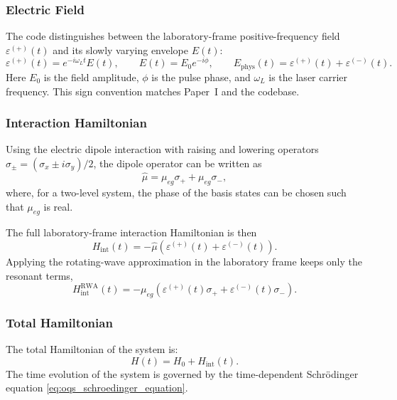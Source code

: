 \subsubsection{Electric Field}
The code distinguishes between the laboratory-frame positive-frequency field \(\varepsilon^{(+)}(t)\) and its slowly varying envelope \(E(t)\):
\begin{equation}
	\varepsilon^{(+)}(t) = e^{-i\omega_{L} t} E(t), \qquad
	E(t) = E_0 e^{-i\phi}, \qquad
	E_{\mathrm{phys}}(t) = \varepsilon^{(+)}(t) + \varepsilon^{(-)}(t).
	\label{eq:ElectricFieldComplex}
\end{equation}
Here \(E_0\) is the field amplitude, \(\phi\) is the pulse phase, and \(\omega_{L}\) is the laser carrier frequency.
This sign convention matches Paper~I and the codebase.

\subsubsection{Interaction Hamiltonian}
Using the electric dipole interaction with raising and lowering operators \(\sigma_\pm = (\sigma_x \pm i\sigma_y)/2\), the dipole operator can be written as
\begin{equation}
	\hat{\mu} = \mu_{eg}\sigma_+ + \mu_{eg}\sigma_-,
	\label{eq:InteractionHamiltonianDipole}
\end{equation}
where, for a two-level system, the phase of the basis states can be chosen such that \(\mu_{eg}\) is real.

The full laboratory-frame interaction Hamiltonian is then
\begin{equation}
	H_{\mathrm{int}}(t) = -\hat{\mu}\left(\varepsilon^{(+)}(t) + \varepsilon^{(-)}(t)\right).
	\label{eq:asdasdasd}
\end{equation}
Applying the rotating-wave approximation in the laboratory frame keeps only the resonant terms,
\begin{equation}
	H_{\mathrm{int}}^{\mathrm{RWA}}(t) = -\mu_{eg}\left(\varepsilon^{(+)}(t)\sigma_+ + \varepsilon^{(-)}(t)\sigma_-\right).
\end{equation}

\subsubsection{Total Hamiltonian}
The total Hamiltonian of the system is:
\begin{equation}
	H(t) = H_0 + H_{\mathrm{int}}(t).
	\label{eq:TotalHamiltonian}
\end{equation}
The time evolution of the system is governed by the time-dependent Schr\"odinger equation \autoref{eq:oqs_schroedinger_equation}.

